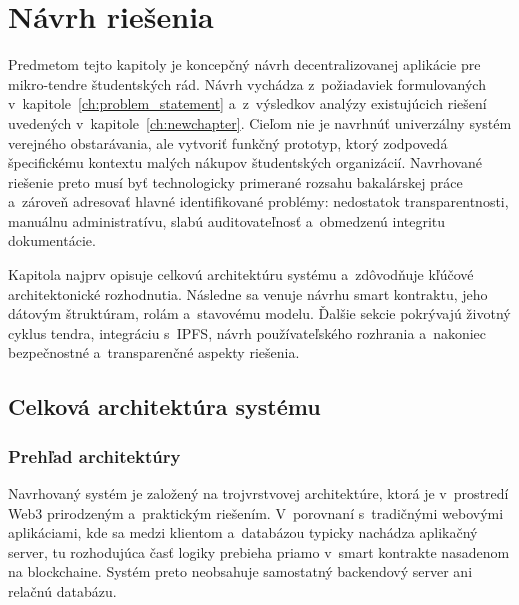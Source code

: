 \chapter{Návrh riešenia}
\label{ch:solution_approach}

Predmetom tejto kapitoly je koncepčný návrh decentralizovanej aplikácie pre
mikro-tendre študentských rád. Návrh vychádza z~požiadaviek formulovaných
v~kapitole~\ref{ch:problem_statement} a~z~výsledkov analýzy existujúcich riešení
uvedených v~kapitole~\ref{ch:newchapter}. Cieľom nie je navrhnúť univerzálny
systém verejného obstarávania, ale vytvoriť funkčný prototyp, ktorý zodpovedá
špecifickému kontextu malých nákupov študentských organizácií. Navrhované riešenie
preto musí byť technologicky primerané rozsahu bakalárskej práce a~zároveň
adresovať hlavné identifikované problémy: nedostatok transparentnosti, manuálnu
administratívu, slabú auditovateľnosť a~obmedzenú integritu dokumentácie.

Kapitola najprv opisuje celkovú architektúru systému a~zdôvodňuje kľúčové
architektonické rozhodnutia. Následne sa venuje návrhu smart kontraktu, jeho
dátovým štruktúram, rolám a~stavovému modelu. Ďalšie sekcie pokrývajú životný
cyklus tendra, integráciu s~IPFS, návrh používateľského rozhrania a~nakoniec
bezpečnostné a~transparenčné aspekty riešenia.

\section{Celková architektúra systému}
\label{sec:system_architecture}

\subsection{Prehľad architektúry}
\label{subsec:architecture_overview}

Navrhovaný systém je založený na trojvrstvovej architektúre, ktorá je
v~prostredí Web3 prirodzeným a~praktickým riešením. V~porovnaní s~tradičnými
webovými aplikáciami, kde sa medzi klientom a~databázou typicky nachádza
aplikačný server, tu rozhodujúca časť logiky prebieha priamo v~smart kontrakte
nasadenom na blockchaine. Systém preto neobsahuje samostatný backendový server
ani relačnú databázu.


